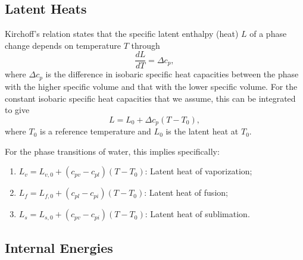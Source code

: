 \documentclass{article}
\begin{document}
\subsection{Latent Heats}

Kirchoff's relation states that the specific latent enthalpy (heat) $L$ of a phase change depends on temperature $T$ through
\begin{equation}
    \frac{dL}{dT} = \Delta c_p,
\end{equation}
where $\Delta c_p$ is the difference in isobaric specific heat capacities between the phase with the higher specific volume and that with the lower specific volume. For the constant isobaric specific heat capacities that we assume, this can be integrated to give
\begin{equation}
    L = L_0 + \Delta c_p (T-T_0),
    \label{eq:LH_temperature}
\end{equation}
where $T_0$ is a reference temperature and $L_0$ is the latent heat at $T_0$. 

For the phase transitions of water, this implies specifically:
\begin{enumerate}
    \item $L_v = L_{v,0} + (c_{pv} - c_{pl}) (T - T_0)$: Latent heat of vaporization;
    \item $L_f = L_{f,0} + (c_{pl} - c_{pi}) (T - T_0)$: Latent heat of fusion;
    \item $L_s = L_{s,0} + (c_{pv} - c_{pi}) (T - T_0)$: Latent heat of sublimation.
\end{enumerate}

\subsection{Internal Energies}\label{s:internal_energies}
\end{document}
